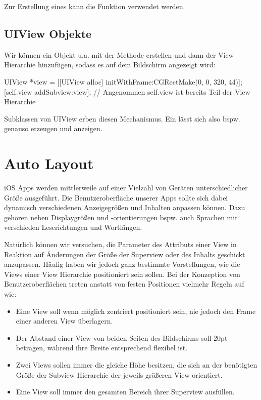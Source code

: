 \documentclass[parskip=half, final]{scrreprt}
\begin{document}
Zur Erstellung eines  kann die Funktion  verwendet werden.

\subsection{UIView Objekte}

Wir können ein  Objekt u.a. mit der  Methode erstellen und dann der View Hierarchie hinzufügen, sodass es auf dem Bildschirm angezeigt wird:
\begin{objclst}
UIView *view = [[UIView alloc] initWithFrame:CGRectMake(0, 0, 320, 44)];
[self.view addSubview:view]; // Angenommen self.view ist bereits Teil der View Hierarchie
\end{objclst}

Subklassen von UIView erben diesen Mechanismus. Ein  lässt sich also bspw. genauso erzeugen und anzeigen.


\section{Auto Layout}

\mvcindicatorview

iOS Apps werden mittlerweile auf einer Vielzahl von Geräten unterschiedlicher Größe ausgeführt. Die Benutzeroberfläche unserer Apps sollte sich dabei dynamisch verschiedenen Anzeigegrößen und Inhalten anpassen können. Dazu gehören neben Displaygrößen und -orientierungen bspw. auch Sprachen mit verschieden Leserichtungen und Wortlängen. %


Natürlich können wir versuchen, die Parameter des  Attributs einer View in Reaktion auf Änderungen der Größe der Superview oder des Inhalts geschickt anzupassen. Häufig haben wir jedoch ganz bestimmte Vorstellungen, wie die Views einer View Hierarchie  positioniert sein sollen. Bei der Konzeption von Benutzeroberflächen treten anstatt von festen Positionen vielmehr Regeln auf wie:
\begin{itemize}
\item Eine View soll wenn möglich zentriert positioniert sein, nie jedoch den Frame einer anderen View überlagern.
\item Der Abstand einer View von beiden Seiten des Bildschirms soll 20pt betragen, während ihre Breite entsprechend flexibel ist.
\item Zwei Views sollen immer die gleiche Höhe besitzen, die sich an der benötigten Größe der Subview Hierarchie der jeweils größeren View orientiert.
\item Eine View soll immer den gesamten Bereich ihrer Superview ausfüllen.
\end{itemize}
\end{document}
